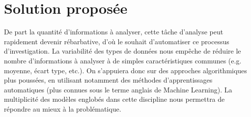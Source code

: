 \section{Solution proposée}
De part la quantité d'informations à analyser, cette tâche d'analyse peut rapidement devenir rébarbative, d'où le souhait d'automatiser ce processus d'investigation. La variabilité des types de données nous empêche de réduire le nombre d'informations à analyser à de simples caractéristiques communes (e.g. moyenne, écart type, etc.). On s'appuiera donc sur des approches algorithmiques plus poussées, en utilisant notamment des méthodes d'apprentissages automatiques (plus connues sous le terme anglais de Machine Learning). La multiplicité des modèles englobés dans cette discipline nous permettra de répondre au mieux à la problématique.